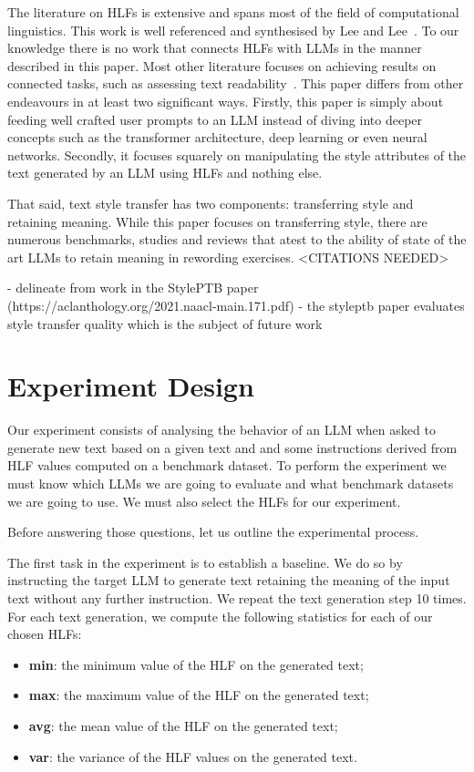 \documentclass[runningheads,a4paper,11pt]{article}
\begin{document}
The literature on HLFs is extensive and spans most of the field of computational
linguistics.
This work is well referenced and synthesised by Lee and Lee~\cite{lftk-2023}.
To our knowledge there is no work that connects HLFs with LLMs in the manner
described in this paper.
Most other literature focuses on achieving results on connected tasks, such as
assessing text readability~\cite{lee-etal-2021-pushing}.
This paper differs from other endeavours in at least two significant ways.
Firstly, this paper is simply about feeding well crafted user prompts to an LLM
instead of diving into deeper concepts such as the transformer architecture,
deep learning or even neural networks.
Secondly, it focuses squarely on manipulating the style attributes of the text
generated by an LLM using HLFs and nothing else.

That said, text style transfer has two components: transferring style and
retaining meaning.
While this paper focuses on transferring style, there are numerous benchmarks,
studies and reviews that atest to the ability of state of the art LLMs to retain
meaning in rewording exercises. <CITATIONS NEEDED>

- delineate from work in the StylePTB paper (https://aclanthology.org/2021.naacl-main.171.pdf)
- the styleptb paper evaluates style transfer quality which is the subject of
future work

\section{Experiment Design}\label{method}

Our experiment consists of analysing the behavior of an LLM when asked to
generate new text based on a given text and and some instructions derived from
HLF values computed on a benchmark dataset.
To perform the experiment we must know which LLMs we are going to evaluate and
what benchmark datasets we are going to use.
We must also select the HLFs for our experiment.

Before answering those questions, let us outline the experimental process.

The first task in the experiment is to establish a baseline.
We do so by instructing the target LLM to generate text retaining the meaning of
the input text without any further instruction.
We repeat the text generation step 10 times.
For each text generation, we compute the following statistics for each of our
chosen HLFs:

\begin{itemize}
    \item \textbf{min}: the minimum value of the HLF on the generated text;
    \item \textbf{max}: the maximum value of the HLF on the generated text;
    \item \textbf{avg}: the mean value of the HLF on the generated text;
    \item \textbf{var}: the variance of the HLF values on the generated text.
\end{itemize}
\end{document}
